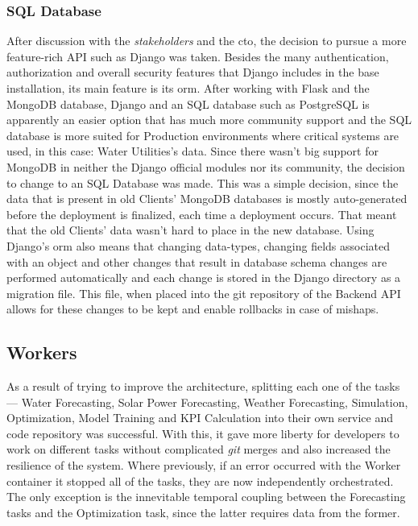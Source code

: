 \subsubsection{SQL Database}\label{methodology:sss:sql-database}
After discussion with the \textit{stakeholders} and the \gls{cto}, the decision to pursue a more feature-rich API such as Django was taken. Besides the many authentication, authorization and overall security features that Django includes in the base installation, its main feature is its \gls{orm}. After working with Flask and the MongoDB database, Django and an SQL database such as PostgreSQL is apparently an easier option that has much more community support and the SQL database is more suited for Production environments where critical systems are used, in this case: Water Utilities's data. Since there wasn't big support for MongoDB in neither the Django official modules nor its community, the decision to change to an SQL Database was made. This was a simple decision, since the data that is present in old Clients' MongoDB databases is mostly auto-generated before the deployment is finalized, each time a deployment occurs. That meant that the old Clients' data wasn't hard to place in the new database.
Using Django's \gls{orm} also means that changing data-types, changing fields associated with an object and other changes that result in database schema changes are performed automatically and each change is stored in the Django directory as a migration file. This file, when placed into the git repository of the Backend API allows for these changes to be kept and enable rollbacks in case of mishaps.

\subsection{Workers}\label{methodology:ss:workers}

As a result of trying to improve the architecture, splitting each one of the tasks --- Water Forecasting, Solar Power Forecasting, Weather Forecasting, Simulation, Optimization, Model Training and KPI Calculation into their own service and code repository was successful. With this, it gave more liberty for developers to work on different tasks without complicated \textit{git} merges and also increased the resilience of the system. Where previously, if an error occurred with the Worker container it stopped all of the tasks, they are now independently orchestrated. The only exception is the innevitable temporal coupling between the Forecasting tasks and the Optimization task, since the latter requires data from the former.

